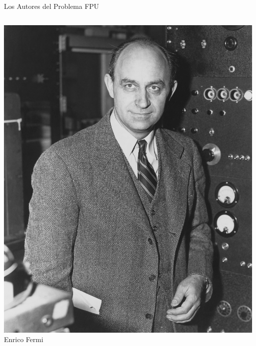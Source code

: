 \begin{frame}{Los Autores del Problema FPU}
    \begin{columns}[T] %
        \begin{column}{0.24\textwidth}
            \centering
            \includegraphics[width=\textwidth]{images/fermi_face.jpg}
            Enrico Fermi
        \end{column}
        

\end{columns}
\end{frame}
